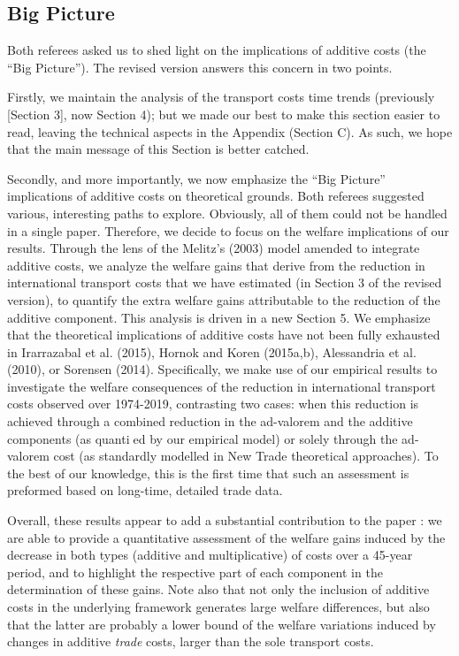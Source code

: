 \documentclass[12pt]{article}
\begin{document}
\subsection{Big Picture}
Both referees asked us to shed light on the implications of additive costs (the ``Big Picture''). The revised version answers this concern in two points. \medskip

Firstly, we maintain the analysis of the transport costs time trends (previously [Section 3], now Section 4); but we made our best to make this section easier to read, leaving the technical aspects in the Appendix (Section C). As such, we hope that the main message of this Section is better catched. \medskip

Secondly, and more importantly, we now emphasize the ``Big Picture'' implications of additive costs on theoretical grounds. Both referees suggested various, interesting paths to explore. Obviously, all of them could not be handled in a single paper. Therefore, we decide to focus on the welfare implications of our results.  Through the lens of the Melitz's (2003) model amended to integrate additive costs, we analyze the welfare gains that derive from the reduction in international transport costs that we have estimated (in Section 3 of the revised version), to quantify the extra welfare gains attributable to the reduction of the additive component. This analysis is driven in a new Section 5. We emphasize that the theoretical implications of additive costs have not been fully exhausted in Irarrazabal et al. (2015), Hornok and Koren (2015a,b), Alessandria et al. (2010), or Sorensen (2014). Specifically, we make use of our empirical results to investigate the welfare consequences of the reduction in international transport costs observed over 1974-2019, contrasting two cases: when this reduction is achieved through a combined reduction in the ad-valorem and the additive components (as quantied by our empirical model) or solely through the ad-valorem cost (as standardly modelled in New Trade theoretical approaches). To the best of our knowledge, this is the first time that such an assessment is preformed based on long-time, detailed trade data.
\medskip

Overall, these results appear to add a substantial contribution to the paper : we are able to provide a quantitative assessment of the welfare gains induced by the decrease in both types (additive and multiplicative) of costs over a 45-year period, and to highlight the respective part of each component in the determination of these gains. Note also that not only the inclusion of additive costs in the underlying framework generates large welfare differences, but also that the latter are probably a lower bound of the welfare variations induced by changes in additive \emph{trade} costs, larger than the sole transport costs.
   
\end{document}
